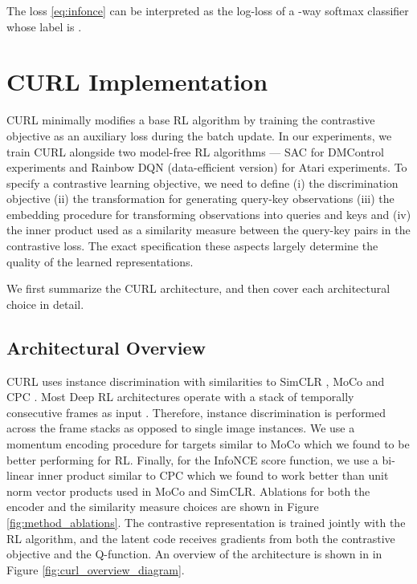 \documentclass{article}
\begin{document}
The loss \ref{eq:infonce} can be interpreted as the log-loss of a -way softmax classifier whose label is . 


\section{CURL Implementation}

CURL minimally modifies a base RL algorithm by training the contrastive objective as an auxiliary loss during the batch update. In our experiments, we train CURL alongside two model-free RL algorithms --- SAC for DMControl experiments and Rainbow DQN (data-efficient version) for Atari experiments. To specify a contrastive learning objective, we need to define (i) the discrimination objective (ii) the transformation for generating query-key observations (iii) the embedding procedure for transforming observations into queries and keys and (iv) the inner product used as a similarity measure between the query-key pairs in the contrastive loss. The exact specification these aspects largely determine the quality of the learned representations.

We first summarize the CURL architecture, and then cover each architectural choice in detail.

\subsection{Architectural Overview}

CURL uses instance discrimination with similarities to SimCLR \cite{chen2020simclr}, MoCo \cite{he2019momentum} and CPC \cite{henaff2019data}. Most Deep RL architectures operate with a stack of temporally consecutive frames as input \cite{hessel2017rainbow}. Therefore, instance discrimination is performed across the frame stacks as opposed to single image instances. We use a momentum encoding procedure for targets similar to MoCo \cite{kaiming2019moco} which we found to be better performing for RL. Finally, for the InfoNCE score function, we use a bi-linear inner product similar to CPC \cite{oord2018representation} which we found to work better than unit norm vector products used in MoCo and SimCLR. Ablations for both the encoder and the similarity measure choices are shown in Figure \ref{fig:method_ablations}. The contrastive representation is trained jointly with the RL algorithm, and the latent code receives gradients from both the contrastive objective and the Q-function. An overview of the architecture is shown in in Figure \ref{fig:curl_overview_diagram}.
\end{document}
